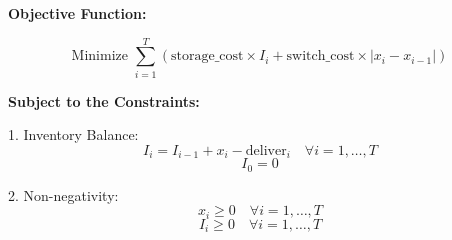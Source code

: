 \documentclass{article}
\begin{document}
\textbf{Objective Function:}

\[
\text{Minimize } \sum_{i=1}^{T} \left( \text{storage\_cost} \times I_i + \text{switch\_cost} \times |x_{i} - x_{i-1}| \right)
\]

\textbf{Subject to the Constraints:}

1. Inventory Balance:
   \[
   I_i = I_{i-1} + x_i - \text{deliver}_i \quad \forall i = 1, \ldots, T
   \]
   \[
   I_0 = 0
   \]

2. Non-negativity:
   \[
   x_i \geq 0 \quad \forall i = 1, \ldots, T
   \]
   \[
   I_i \geq 0 \quad \forall i = 1, \ldots, T
   \]
\end{document}
